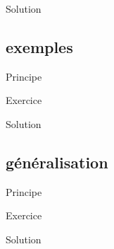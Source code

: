 \documentclass[11pt]{beamer}
\begin{document}
\begin{frame}{Solution}

\end{frame}

\subsection{exemples}

\begin{frame}{Principe}

\end{frame}

\begin{frame}{Exercice}

\end{frame}

\begin{frame}{Solution}

\end{frame}

\subsection{généralisation}

\begin{frame}{Principe}

\end{frame}

\begin{frame}{Exercice}

\end{frame}

\begin{frame}{Solution}

\end{frame}
\end{document}
